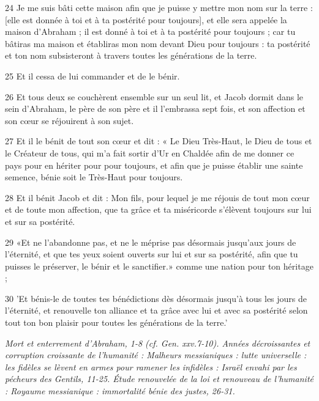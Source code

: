 \par    
\par 24 Je me suis bâti cette maison afin que je puisse y mettre mon nom sur la terre : [elle est donnée à toi et à ta postérité pour toujours], et elle sera appelée la maison d'Abraham ; il est donné à toi et à ta postérité pour toujours ; car tu bâtiras ma maison et établiras mon nom devant Dieu pour toujours : ta postérité et ton nom subsisteront à travers toutes les générations de la terre.
\par    
\par 25 Et il cessa de lui commander et de le bénir.
\par 26 Et tous deux se couchèrent ensemble sur un seul lit, et Jacob dormit dans le sein d'Abraham, le père de son père et il l'embrassa sept fois, et son affection et son cœur se réjouirent à son sujet.
\par 27 Et il le bénit de tout son cœur et dit : « Le Dieu Très-Haut, le Dieu de tous et le Créateur de tous, qui m'a fait sortir d'Ur en Chaldée afin de me donner ce pays pour en hériter pour pour toujours, et afin que je puisse établir une sainte semence, bénie soit le Très-Haut pour toujours.
\par 28 Et il bénit Jacob et dit : Mon fils, pour lequel je me réjouis de tout mon cœur et de toute mon affection, que ta grâce et ta miséricorde s'élèvent toujours sur lui et sur sa postérité.
\par 29 «Et ne l'abandonne pas, et ne le méprise pas désormais jusqu'aux jours de l'éternité, et que tes yeux soient ouverts sur lui et sur sa postérité, afin que tu puisses le préserver, le bénir et le sanctifier.» comme une nation pour ton héritage ;
\par 30 'Et bénis-le de toutes tes bénédictions dès désormais jusqu'à tous les jours de l'éternité, et renouvelle ton alliance et ta grâce avec lui et avec sa postérité selon tout ton bon plaisir pour toutes les générations de la terre.'


\par \textit{Mort et enterrement d'Abraham, 1-8 (cf. Gen. xxv.7-10). Années décroissantes et corruption croissante de l'humanité : Malheurs messianiques : lutte universelle : les fidèles se lèvent en armes pour ramener les infidèles : Israël envahi par les pécheurs des Gentils, 11-25. Étude renouvelée de la loi et renouveau de l'humanité : Royaume messianique : immortalité bénie des justes, 26-31.}

